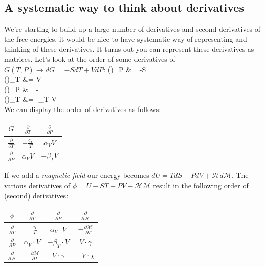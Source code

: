 \documentclass[12pt]{article}
\begin{document}
\subsection{A systematic way to think about derivatives} \label{systematicWayDerivatives}
We're starting to build up a large number of derivatives and second derivatives of the free energies, it would be nice to have systematic way of representing and thinking of these derivatives. It turns out you can represent these derivatives as matrices. Let's look at the order of some derivatives of $G(T,P) \rightarrow dG = -S dT + V dP$:
\eqs
\left(\right)_P &= -S\\
\left(\right)_T &= V\\
\left(\right)_P &= -\\
\left(\right)_T &= -\beta_T V\\
\eqe
We can display the order of derivatives as follows:\\
\begin{center}
\begin{tabular}{c | c | c}
 $G$ & $\frac{\partial}{\partial T}$ & $\frac{\partial}{\partial P}$\\ \hline
 $\frac{\partial}{\partial T}$ & $-\frac{c_P}{T}$ & $\alpha_V V$\\ \hline
 $\frac{\partial}{\partial P}$ & $\alpha_V V$ & $-\beta_T V$
\end{tabular}
\end{center}
If we add a \emph{magnetic field} our energy becomes $dU = TdS - PdV + \mathcal{H} d\mathcal{M}$.  The various derivatives of $\phi = U - ST + PV - \mathcal{H}\mathcal{M}$ result in the following order of (second) derivatives:
\begin{center}
\begin{tabular}{c | c | c | c}
$\phi$ & $\frac{\partial}{\partial T}$ & $\frac{\partial}{\partial P}$& $\frac{\partial}{\partial \mathcal{H}}$\\ \hline
$\frac{\partial}{\partial T}$ & $-\frac{c_P}{T}$ & $\alpha_V \cdot V$ & $-\frac{\partial \mathcal{M}}{\partial T}$\\ \hline
$\frac{\partial}{\partial P}$ & $\alpha_V \cdot V$ & $-\beta_T \cdot V$ & $V \cdot \gamma$\\ \hline
$\frac{\partial}{\partial \mathcal{H}}$ & $-\frac{\partial \mathcal{M}}{\partial T}$ & $V \cdot \gamma$ & $-V \cdot \chi$
\end{tabular}
\end{center}
\end{document}
